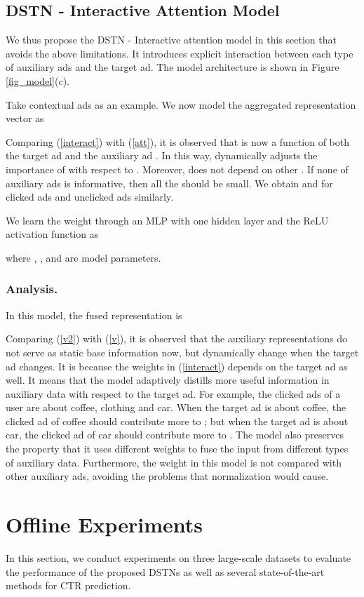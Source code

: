 \documentclass[sigconf]{acmart}
\begin{document}
\subsection{DSTN - Interactive Attention Model} \label{sec_dstn}
We thus propose the DSTN - Interactive attention model in this section that avoids the above limitations.  It introduces explicit interaction between each type of auxiliary ads and the target ad. The model architecture is shown in Figure \ref{fig_model}(c).

Take contextual ads as an example. We now model the aggregated representation vector as

Comparing (\ref{interact}) with (\ref{att}), it is observed that  is now a function of both the target ad  and the auxiliary ad . In this way,  dynamically adjusts the importance of  with respect to .
Moreover,  does not depend on other . If none of auxiliary ads is informative, then all the  should be small. We obtain  and  for clicked ads and unclicked ads similarly.

We learn the weight  through an MLP with one hidden layer and the ReLU activation function as

where , ,  and  are model parameters.

\subsubsection{Analysis.}
In this model, the fused representation  is

Comparing (\ref{v2}) with (\ref{v}), it is observed that the auxiliary representations do not serve as static base information now, but dynamically change when the target ad changes. It is because the weights in (\ref{interact}) depends on the target ad as well. It means that the model adaptively distills more useful information in auxiliary data with respect to the target ad. For example, the clicked ads of a user are about coffee, clothing and car. When the target ad  is about coffee, the clicked ad of coffee should contribute more to ; but when the target ad is about car, the clicked ad of car should contribute more to . The model also preserves the property that it uses different weights to fuse the input from different types of auxiliary data. Furthermore, the weight  in this model is not compared with other auxiliary ads, avoiding the problems that normalization would cause.

\section{Offline Experiments}
In this section, we conduct experiments on three large-scale datasets to evaluate the performance of the proposed DSTNs as well as several state-of-the-art methods for CTR prediction.
\end{document}
